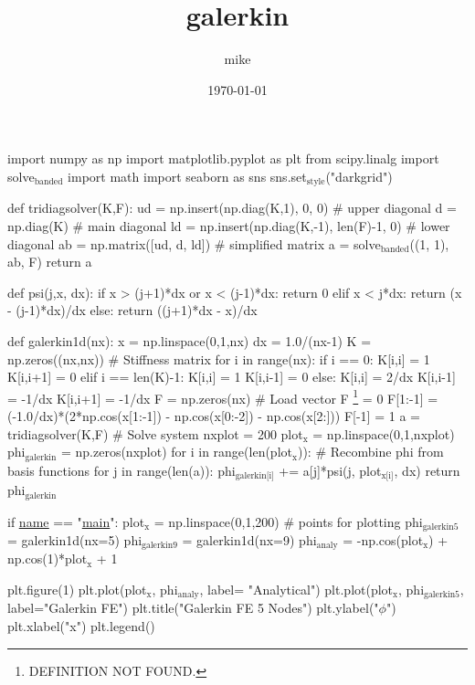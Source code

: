 \documentclass[11pt]{article}
\author{mike}
\date{\today}
\title{galerkin}
\begin{document}
\maketitle
\tableofcontents

import numpy as np
import matplotlib.pyplot as plt
from scipy.linalg import solve$_{\text{banded}}$
import math
import seaborn as sns
sns.set$_{\text{style}}$("darkgrid")


def tridiagsolver(K,F):
    ud = np.insert(np.diag(K,1), 0, 0)           \# upper diagonal
    d = np.diag(K)                               \# main diagonal
    ld = np.insert(np.diag(K,-1), len(F)-1, 0)   \# lower diagonal
    ab = np.matrix([ud, d, ld])                  \# simplified matrix
    a = solve$_{\text{banded}}$((1, 1), ab, F)
    return a

def psi(j,x, dx):
    if x > (j+1)*dx or x < (j-1)*dx:
        return 0
    elif x < j*dx:
        return (x - (j-1)*dx)/dx
    else:
        return ((j+1)*dx - x)/dx

def galerkin1d(nx):
    x = np.linspace(0,1,nx)
    dx = 1.0/(nx-1)
    K = np.zeros((nx,nx))                            \# Stiffness matrix
    for i in range(nx):
        if i == 0:
            K[i,i] = 1
            K[i,i+1] = 0
        elif i == len(K)-1:
            K[i,i] = 1
            K[i,i-1] = 0
        else:
            K[i,i] = 2/dx
            K[i,i-1] = -1/dx
            K[i,i+1] = -1/dx
    F = np.zeros(nx)                                 \# Load vector
    F \footnote{DEFINITION NOT FOUND.} = 0
    F[1:-1] = (-1.0/dx)*(2*np.cos(x[1:-1]) - np.cos(x[0:-2]) - np.cos(x[2:]))
    F[-1] = 1
    a = tridiagsolver(K,F)                           \# Solve system
    nxplot = 200
    plot$_{\text{x}}$ = np.linspace(0,1,nxplot)
    phi$_{\text{galerkin}}$ = np.zeros(nxplot)
    for i in range(len(plot$_{\text{x}}$)):                     \# Recombine phi from basis functions
        for j in range(len(a)):
            phi$_{\text{galerkin[i]}}$ +=  a[j]*psi(j, plot$_{\text{x[i]}}$, dx)
    return phi$_{\text{galerkin}}$

if \uline{\uline{name}} == "\uline{\uline{main}}":
    plot$_{\text{x}}$ = np.linspace(0,1,200)  \# points for  plotting
    phi$_{\text{galerkin5}}$ = galerkin1d(nx=5)
    phi$_{\text{galerkin9}}$ = galerkin1d(nx=9)
    phi$_{\text{analy}}$ = -np.cos(plot$_{\text{x}}$) + np.cos(1)*plot$_{\text{x}}$ + 1

plt.figure(1)
plt.plot(plot$_{\text{x}}$, phi$_{\text{analy}}$, label= "Analytical")
plt.plot(plot$_{\text{x}}$, phi$_{\text{galerkin5}}$, label="Galerkin FE")
plt.title("Galerkin FE 5 Nodes")
plt.ylabel("$\phi$")
plt.xlabel("x")
plt.legend()
\end{document}
